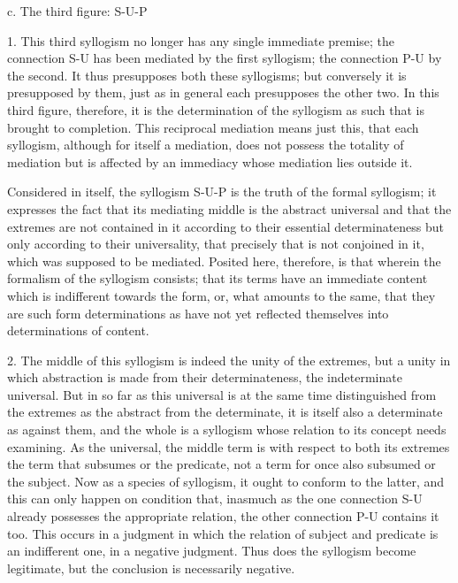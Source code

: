 c. The third figure: S-U-P

1. This third syllogism no longer has any single immediate premise;
the connection S-U has been mediated by the first syllogism;
the connection P-U by the second.
It thus presupposes both these syllogisms;
but conversely it is presupposed by them,
just as in general each presupposes the other two.
In this third figure, therefore, it is the determination of the syllogism
as such that is brought to completion.
This reciprocal mediation means just this,
that each syllogism, although for itself a mediation,
does not possess the totality of mediation
but is affected by an immediacy
whose mediation lies outside it.

Considered in itself, the syllogism S-U-P is
the truth of the formal syllogism;
it expresses the fact that
its mediating middle is the abstract universal
and that the extremes are not contained in it
according to their essential determinateness
but only according to their universality,
that precisely that is not conjoined in it,
which was supposed to be mediated.
Posited here, therefore, is that
wherein the formalism of the syllogism consists;
that its terms have an immediate content
which is indifferent towards the form,
or, what amounts to the same,
that they are such form determinations
as have not yet reflected themselves
into determinations of content.

2. The middle of this syllogism is indeed the unity of the extremes,
but a unity in which abstraction is made from their determinateness,
the indeterminate universal.
But in so far as this universal is at the same time distinguished
from the extremes as the abstract from the determinate,
it is itself also a determinate as against them,
and the whole is a syllogism
whose relation to its concept needs examining.
As the universal, the middle term is
with respect to both its extremes
the term that subsumes or the predicate,
not a term for once also subsumed or the subject.
Now as a species of syllogism, it ought to conform to the latter,
and this can only happen on condition that,
inasmuch as the one connection S-U
already possesses the appropriate relation,
the other connection P-U contains it too.
This occurs in a judgment in which
the relation of subject and predicate is
an indifferent one, in a negative judgment.
Thus does the syllogism become legitimate,
but the conclusion is necessarily negative.

